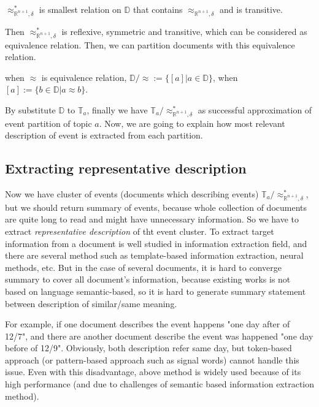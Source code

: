 \begin{definition}
    $\approx_{\mathbb{R}^{n+1}, \delta}^{*}$ is smallest relation on $\mathbb{D}$ that contains $\approx_{\mathbb{R}^{n+1}, \delta}$ and is transitive.
\end{definition}

Then $\approx_{\mathbb{R}^{n+1}, \delta}^{*}$ is reflexive, symmetric and transitive, which can be considered as equivalence relation.
Then, we can partition documents with this equivalence relation.

\begin{definition}
    when $\approx$ is equivalence relation, $\mathbb{D}/\approx := \{[a] | a \in \mathbb{D}\}$, when $[a] := \{b \in \mathbb{D} | a \approx b \}$.
\end{definition}

By substitute $\mathbb{D}$ to $\mathbb{T}_{a}$, finally we have $\mathbb{T}_{a}/\approx_{\mathbb{R}^{n+1}, \delta}^{*}$ as successful approximation 
of event partition of topic $a$. Now, we are going to explain how most relevant description of event is extracted from each partition.

\subsection{Extracting representative description}

Now we have cluster of events (documents which describing events) $\mathbb{T}_{a}/\approx_{\mathbb{R}^{n+1}, \delta}^{*}$, but we should
return summary of events, because whole collection of documents are quite long to read and might have
unnecessary information. So we have to extract \textit{representative description} of tht event cluster.
To extract target information from a document is well studied in information extraction field,
and there are several method such as template-based information extraction, neural methods, etc.
But in the case of several documents, it is hard to converge summary to cover all document's information,
because existing works is not based on language semantic-based, so it is hard to generate summary statement
between description of similar/same meaning. 

For example, if one document describes the event happens "one day after of 12/7", and there are another
document describe the event was happened "one day before of 12/9". Obviously, both description
refer same day, but token-based approach (or pattern-based approach such as signal words) cannot
handle this issue. Even with this disadvantage, above method is widely used because of
its high performance (and due to challenges of semantic based information extraction method).

